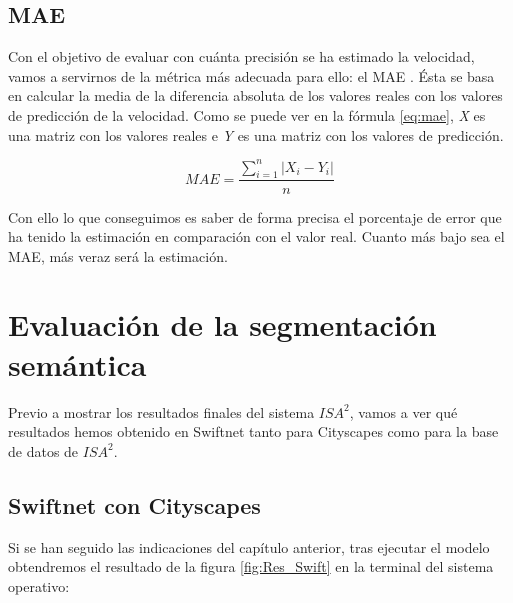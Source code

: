 \subsection{MAE}

Con el objetivo de evaluar con cuánta precisión se ha estimado la velocidad, vamos a servirnos de la métrica más adecuada para ello: el \ac{MAE} \cite{mae}. Ésta se basa en calcular la media de la diferencia absoluta de los valores reales con los valores de predicción de la velocidad. Como se puede ver en la fórmula \ref{eq:mae}, \textit{X} es una matriz con los valores reales e \textit{Y} es una matriz con los valores de predicción.

\begin{equation}\label{eq:mae}
MAE = \frac{\sum_{i=1}^{n}|X_i - Y_i|}{n}
\end{equation}

Con ello lo que conseguimos es saber de forma precisa el porcentaje de error que ha tenido la estimación en comparación con el valor real. Cuanto más bajo sea el \ac{MAE}, más veraz será la estimación.

\section{Evaluación de la segmentación semántica}

Previo a mostrar los resultados finales del sistema $ISA^{2}$, vamos a ver qué resultados hemos obtenido en Swiftnet tanto para Cityscapes como para la base de datos de $ISA^{2}$.

\subsection{Swiftnet con Cityscapes}

Si se han seguido las indicaciones del capítulo anterior, tras ejecutar el modelo obtendremos el resultado de la figura \ref{fig:Res_Swift} en la terminal del sistema operativo:

